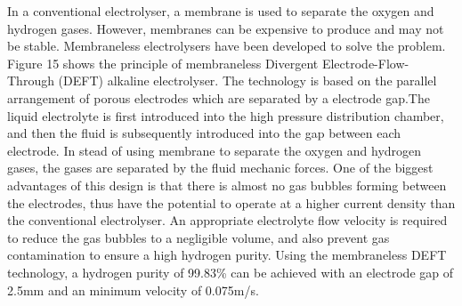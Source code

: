 In a conventional electrolyser, a membrane is used to separate the oxygen and hydrogen gases. However, membranes can be expensive to produce and may not be stable. Membraneless electrolysers have been developed to solve the problem. Figure 15 shows the principle of membraneless Divergent Electrode-Flow-Through (DEFT) alkaline electrolyser. The technology is based on the parallel arrangement of porous electrodes which are separated by a electrode gap.The liquid electrolyte is first introduced into the high pressure distribution chamber, and then the fluid is subsequently introduced into the gap between each electrode. In stead of using membrane to separate the oxygen and hydrogen gases, the gases are separated by the fluid mechanic forces.\cite{membraneless2} One of the biggest advantages of this design is that there is almost no gas bubbles forming between the electrodes, thus have the potential to operate at a higher current density than the conventional electrolyser. An appropriate electrolyte flow velocity is required to reduce the gas bubbles to a negligible volume, and also prevent gas contamination to ensure a high hydrogen purity. Using the membraneless DEFT technology, a hydrogen purity of 99.83\% can be achieved with an electrode gap of 2.5mm and an minimum velocity of 0.075m/s.



